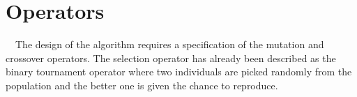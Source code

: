 \section[Operators]{\label{identificadorReferenciaCruzada}
Operators}

\ \ The design of the algorithm requires a specification of the mutation and crossover operators. The selection operator has already been described as the binary tournament operator where two individuals are picked randomly from the population and the better one is given the chance to reproduce.